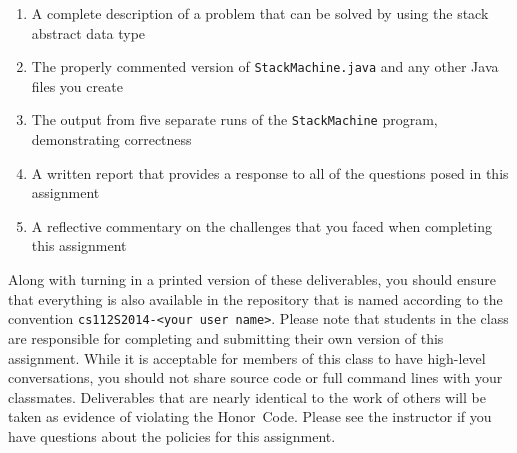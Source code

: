   \begin{enumerate} 
  \itemsep0pt

  \item A complete description of a problem that can be solved by using the stack abstract data type

  \item The properly commented version of {\tt StackMachine.java} and any other Java files you create

  \item The output from five separate runs of the {\tt StackMachine} program, demonstrating correctness 

  \item A written report that provides a response to all of the questions posed in this assignment

  \item A reflective commentary on the challenges that you faced when completing this assignment 
   
  \end{enumerate}

  Along with turning in a printed version of these deliverables, you should ensure that everything is also available in
  the repository that is named according to the convention {\tt cs112S2014-<your user name>}. Please note that students
  in the class are responsible for completing and submitting their own version of this assignment.    While it is
  acceptable for members of this class to have high-level conversations, you should not share source code or full
  command lines with your classmates.  Deliverables that are nearly identical to the work of others will be taken as
  evidence of violating the \mbox{Honor Code}.  Please see the instructor if you have questions about the policies for
  this assignment.

  
